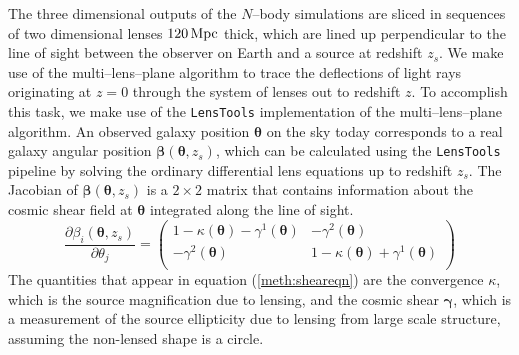 \documentclass[reprint,aps,prd,superscriptaddress,showkeys,showpacs]{revtex4-1}
\newcommand{\ttt}[1]{\texttt{#1}}
\begin{document}
The three dimensional outputs of the $N$--body simulations are sliced in sequences of two dimensional lenses $120 \,{\rm Mpc}$ thick, which are lined up perpendicular to the line of sight between the observer on Earth and a source at redshift $z_s$. We make use of the multi--lens--plane algorithm \citep{RayTracingJain,RayTracingHartlap} to trace the deflections of light rays originating at $z=0$ through the system of lenses out to redshift $z$. To accomplish this task, we make use of the \ttt{LensTools} \citep{LensTools-ASCL,LensTools-paper} implementation of the multi--lens--plane algorithm. An observed galaxy position $\pmb{\theta}$ on the sky today corresponds to a real galaxy angular position $\pmb{\beta}(\pmb{\theta},z_s)$, which can be calculated using the \ttt{LensTools} pipeline by solving the ordinary differential lens equations up to redshift $z_s$. The Jacobian of $\pmb{\beta}(\pmb{\theta},z_s)$ is a $2\times 2$ matrix that contains information about the cosmic shear field at $\pmb{\theta}$ integrated along the line of sight. 
%
\begin{equation}
\label{meth:sheareqn}
\frac{\partial\beta_i(\pmb{\theta},z_s)}{\partial \theta_j} = 
\begin{pmatrix}
1-\kappa(\pmb{\theta})-\gamma^1(\pmb{\theta}) & -\gamma^2(\pmb{\theta}) \\
-\gamma^2(\pmb{\theta}) & 1-\kappa(\pmb{\theta})+\gamma^1(\pmb{\theta})\\
\end{pmatrix}
\end{equation}  
%
The quantities that appear in equation (\ref{meth:sheareqn}) are the convergence $\kappa$, which is the source magnification due to lensing, and the cosmic shear $\pmb{\gamma}$, which is a measurement of the source ellipticity due to lensing from large scale structure, assuming the non-lensed shape is a circle. 
\end{document}
